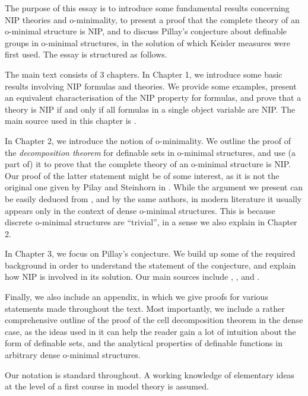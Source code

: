 \documentclass[a4paper]{report}
\newcommand{\ind}{\hspace{15pt}}
\theoremstyle{definition}
\theoremstyle{remstyle}
\begin{document}
\ind The purpose of this essay is to introduce some fundamental results concerning NIP theories and o-minimality, to present a proof that the complete theory of an o-minimal structure is NIP, and to discuss Pillay's conjecture about definable groups in o-minimal structures, in the solution of which Keisler measures were first used. The essay is structured as follows.

\ind The main text consists of 3 chapters. In Chapter 1, we introduce some basic results involving NIP formulas and theories. We provide some examples, present an equivalent characterisation of the NIP property for formulas, and prove that a theory is NIP if and only if all formulas in a single object variable are NIP. The main source used in this chapter is \cite{nip guide}.

\ind In Chapter 2, we introduce the notion of o-minimality. We outline the proof of the \emph{decomposition theorem} for definable sets in o-minimal structures, and use (a part of) it to prove that the complete theory of an o-minimal structure is NIP. Our proof of the latter statement might be of some interest, as it is not the original one given by Pilay and Steinhorn in \cite{defI}. While the argument we present can be easily deduced from \cite{defII}, \cite{discrete} and \cite{defIII} by the same authors, in modern literature it usually appears only in the context of dense o-minimal structures. This is because discrete o-minimal structures are ``trivial'', in a sense we also explain in Chapter 2.

\ind In Chapter 3, we focus on Pillay's conjecture. We build up some of the required background in order to understand the statement of the conjecture, and explain how NIP is involved in its solution. Our main sources include \cite{typedef}, \cite{groups measures nip}, \cite{Pillay survey} and \cite{survey1}.

\ind Finally, we also include an appendix, in which we give proofs for various statements made throughout the text. Most importantly, we include a rather comprehensive outline of the proof of the cell decomposition theorem in the dense case, as the ideas used in it can help the reader gain a lot of intuition about the form of definable sets, and the analytical properties of definable functions in arbitrary dense o-minimal structures.

\ind Our notation is standard throughout. A working knowledge of elementary ideas at the level of a first course in model theory is assumed.


\newpage
\end{document}
